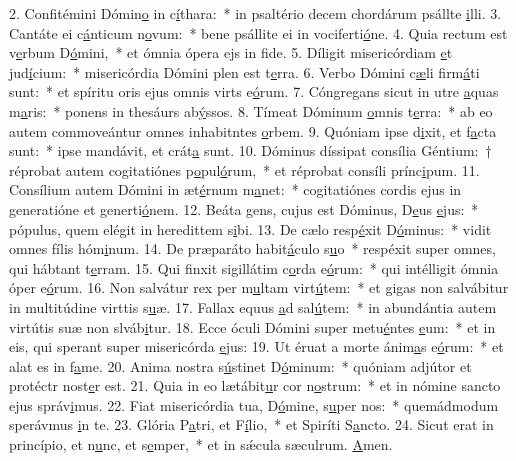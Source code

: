 2. Confitémini Dómin\uline{o} in c\uline{í}thara:~* in psaltério decem chordárum psállte \uline{i}lli.
3. Cantáte ei c\uline{á}nticum n\uline{o}vum:~* bene psállite ei in vociferti\uline{ó}ne.
4. Quia rectum est v\uline{e}rbum D\uline{ó}mini,~* et ómnia ópera ejs in f\uline{i}de.
5. Díligit misericórdiam \uline{e}t jud\uline{í}cium:~* misericórdia Dómini plen est t\uline{e}rra.
6. Verbo Dómini c\uline{æ}li firm\uline{á}ti sunt:~* et spíritu oris ejus omnis virts e\uline{ó}rum.
7. Cóngregans sicut in utre \uline{a}quas m\uline{a}ris:~* ponens in thesáurs ab\uline{ý}ssos.
8. Tímeat Dóminum \uline{o}mnis t\uline{e}rra:~* ab eo autem commoveántur omnes inhabitntes \uline{o}rbem.
9. Quóniam ipse d\uline{i}xit, et f\uline{a}cta sunt:~* ipse mandávit, et crát\uline{a} sunt.
10. Dóminus díssipat consília Géntium:~† réprobat autem cogitatiónes p\uline{o}pul\uline{ó}rum,~* et réprobat consíli prínc\uline{i}pum.
11. Consílium autem Dómini in æt\uline{é}rnum m\uline{a}net:~* cogitatiónes cordis ejus in generatióne et generti\uline{ó}nem.
12. Beáta gens, cujus est Dóminus, D\uline{e}us \uline{e}jus:~* pópulus, quem elégit in heredittem s\uline{i}bi.
13. De cælo resp\uline{é}xit D\uline{ó}minus:~* vidit omnes fílis hóm\uline{i}num.
14. De præparáto habit\uline{á}culo s\uline{u}o~* respéxit super omnes, qui hábtant t\uline{e}rram.
15. Qui finxit sigillátim c\uline{o}rda e\uline{ó}rum:~* qui intélligit ómnia óper e\uline{ó}rum.
16. Non salvátur rex per m\uline{u}ltam virt\uline{ú}tem:~* et gigas non salvábitur in multitúdine virttis s\uline{u}æ.
17. Fallax equus \uline{a}d sal\uline{ú}tem:~* in abundántia autem virtútis suæ non slváb\uline{i}tur.
18. Ecce óculi Dómini super metu\uline{é}ntes \uline{e}um:~* et in eis, qui sperant super misericórda \uline{e}jus:
19. Ut éruat a morte ánim\uline{a}s e\uline{ó}rum:~* et alat es in f\uline{a}me.
20. Anima nostra s\uline{ú}stinet D\uline{ó}minum:~* quóniam adjútor et protéctr nost\uline{e}r est.
21. Quia in eo lætábit\uline{u}r cor n\uline{o}strum:~* et in nómine sancto ejus správ\uline{i}mus.
22. Fiat misericórdia tua, D\uline{ó}mine, s\uline{u}per nos:~* quemádmodum sperávmus \uline{i}n te.
23. Glória P\uline{a}tri, et F\uline{í}lio,~* et Spiríti S\uline{a}ncto.
24. Sicut erat in princípio, et n\uline{u}nc, et s\uline{e}mper,~* et in sǽcula sæculrum. \uline{A}men.
